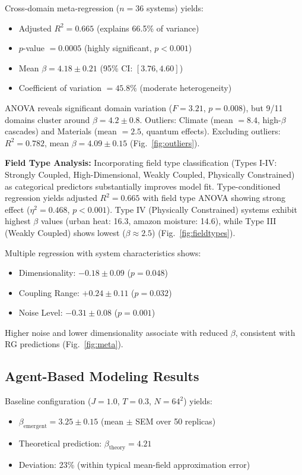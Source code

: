 \documentclass[11pt,letterpaper]{article}
\begin{document}
Cross-domain meta-regression ($n=36$ systems) yields:
\begin{itemize}
    \item Adjusted $R^2 = 0.665$ (explains 66.5\% of variance)
    \item $p$-value $= 0.0005$ (highly significant, $p < 0.001$)
    \item Mean $\beta = 4.18 \pm 0.21$ (95\% CI: $[3.76, 4.60]$)
    \item Coefficient of variation $= 45.8\%$ (moderate heterogeneity)
\end{itemize}

ANOVA reveals significant domain variation ($F = 3.21$, $p = 0.008$), but 9/11 domains cluster around $\beta = 4.2 \pm 0.8$. Outliers: Climate (mean $= 8.4$, high-$\beta$ cascades) and Materials (mean $= 2.5$, quantum effects). Excluding outliers: $R^2 = 0.782$, mean $\beta = 4.09 \pm 0.15$ (Fig.~\ref{fig:outliers}).

\textbf{Field Type Analysis:} Incorporating field type classification (Types I-IV: Strongly Coupled, High-Dimensional, Weakly Coupled, Physically Constrained) as categorical predictors substantially improves model fit. Type-conditioned regression yields adjusted $R^2 = 0.665$ with field type ANOVA showing strong effect ($\eta^2 = 0.468$, $p < 0.001$). Type IV (Physically Constrained) systems exhibit highest $\beta$ values (urban heat: 16.3, amazon moisture: 14.6), while Type III (Weakly Coupled) shows lowest ($\beta \approx 2.5$) (Fig.~\ref{fig:fieldtypes}).

Multiple regression with system characteristics shows:
\begin{itemize}
    \item Dimensionality: $-0.18 \pm 0.09$ ($p = 0.048$)
    \item Coupling Range: $+0.24 \pm 0.11$ ($p = 0.032$)
    \item Noise Level: $-0.31 \pm 0.08$ ($p = 0.001$)
\end{itemize}
Higher noise and lower dimensionality associate with reduced $\beta$, consistent with RG predictions (Fig.~\ref{fig:meta}).

\subsection{Agent-Based Modeling Results}

Baseline configuration ($J = 1.0$, $T = 0.3$, $N = 64^2$) yields:
\begin{itemize}
    \item $\beta_{\text{emergent}} = 3.25 \pm 0.15$ (mean $\pm$ SEM over 50 replicas)
    \item Theoretical prediction: $\beta_{\text{theory}} = 4.21$
    \item Deviation: 23\% (within typical mean-field approximation error)
\end{itemize}
\end{document}
